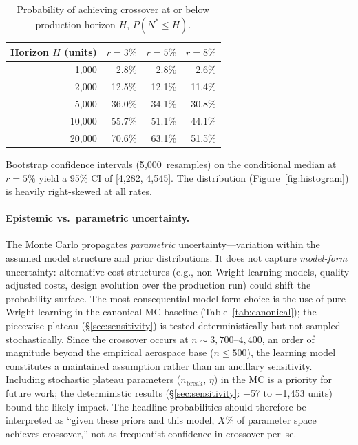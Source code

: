 \documentclass[preprint,12pt]{elsarticle}
\begin{document}
\begin{table}[htbp]
\centering
\caption{Probability of achieving crossover at or below production horizon $H$, $P(N^* \leq H)$.}
\label{tab:convergence}
\small
\begin{tabular}{@{}rrrr@{}}
\toprule
Horizon $H$ (units) & $r = 3\%$ & $r = 5\%$ & $r = 8\%$ \\
\midrule
1{,}000  & 2.8\% & 2.8\% & 2.6\% \\
2{,}000  & 12.5\% & 12.1\% & 11.4\% \\
5{,}000  & 36.0\% & 34.1\% & 30.8\% \\
10{,}000 & 55.7\% & 51.1\% & 44.1\% \\
20{,}000 & 70.6\% & 63.1\% & 51.5\% \\
\bottomrule
\end{tabular}
\end{table}

Bootstrap confidence intervals (5{,}000~resamples) on the conditional median at $r = 5\%$ yield a 95\% CI of [4{,}282, 4{,}545]. The distribution (Figure~\ref{fig:histogram}) is heavily right-skewed at all rates.

\paragraph{Epistemic vs.\ parametric uncertainty.} The Monte Carlo propagates \emph{parametric} uncertainty---variation within the assumed model structure and prior distributions. It does not capture \emph{model-form} uncertainty: alternative cost structures (e.g., non-Wright learning models, quality-adjusted costs, design evolution over the production run) could shift the probability surface. The most consequential model-form choice is the use of pure Wright learning in the canonical MC baseline (Table~\ref{tab:canonical}); the piecewise plateau (\S\ref{sec:sensitivity}) is tested deterministically but not sampled stochastically. Since the crossover occurs at $n \sim 3{,}700$--$4{,}400$, an order of magnitude beyond the empirical aerospace base ($n \leq 500$), the learning model constitutes a maintained assumption rather than an ancillary sensitivity. Including stochastic plateau parameters ($n_{\mathrm{break}}$, $\eta$) in the MC is a priority for future work; the deterministic results (\S\ref{sec:sensitivity}: $-$57 to $-$1{,}453 units) bound the likely impact. The headline probabilities should therefore be interpreted as ``given these priors and this model, $X$\% of parameter space achieves crossover,'' not as frequentist confidence in crossover per~se.
\end{document}
